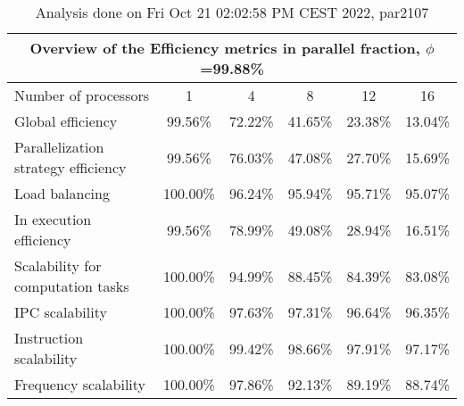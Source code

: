 \begin{table}[h]
\begin{center}
\begin{tabular}{|l|c|c|c|c|c|}
\hline
\multicolumn{6}{|c|}{Overview of the Efficiency metrics in parallel fraction, $\phi$=99.88\%} \\
\hline
\hline
Number of processors & 1 & 4 & 8 & 12 & 16 \\
\hline
\hline
Global efficiency                      &     99.56\% &     72.22\% &     41.65\% &     23.38\% &     13.04\% \\
\hline
\hline
Parallelization strategy efficiency &     99.56\% &     76.03\% &     47.08\% &     27.70\% &     15.69\% \\
\hline
Load balancing                   &    100.00\% &     96.24\% &     95.94\% &     95.71\% &     95.07\% \\
In execution efficiency          &     99.56\% &     78.99\% &     49.08\% &     28.94\% &     16.51\% \\
\hline
\hline
Scalability for computation tasks   &    100.00\% &     94.99\% &     88.45\% &     84.39\% &     83.08\% \\
\hline
IPC scalability                  &    100.00\% &     97.63\% &     97.31\% &     96.64\% &     96.35\% \\
Instruction scalability          &    100.00\% &     99.42\% &     98.66\% &     97.91\% &     97.17\% \\
Frequency scalability            &    100.00\% &     97.86\% &     92.13\% &     89.19\% &     88.74\% \\
\hline
\end{tabular}
\end{center}
\caption{ Analysis done on Fri Oct 21 02:02:58 PM CEST 2022, par2107}
\end{table}
